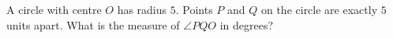 A circle with centre $O$ has radius $5$. Points $P$ and $Q$ on the circle are exactly $5$ units apart. What is the measure of $\angle PQO$ in degrees?
